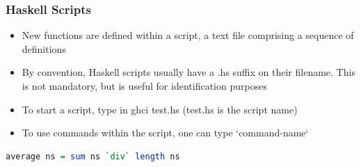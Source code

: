 \hypertarget{haskell-scripts}{%
\subsubsection{Haskell Scripts}\label{haskell-scripts}}

\begin{itemize}
\tightlist
\item
  New functions are defined within a script, a text file comprising a
  sequence of definitions
\item
  By convention, Haskell scripts usually have a .hs suffix on their
  filename. This is not mandatory, but is useful for identification
  purposes
\item
  To start a script, type in ghci test.hs (test.hs is the script name)
\item
  To use commands within the script, one can type `command-name`
\end{itemize}

\begin{lstlisting}[language=Haskell]
average ns = sum ns `div` length ns
\end{lstlisting}

\clearpage